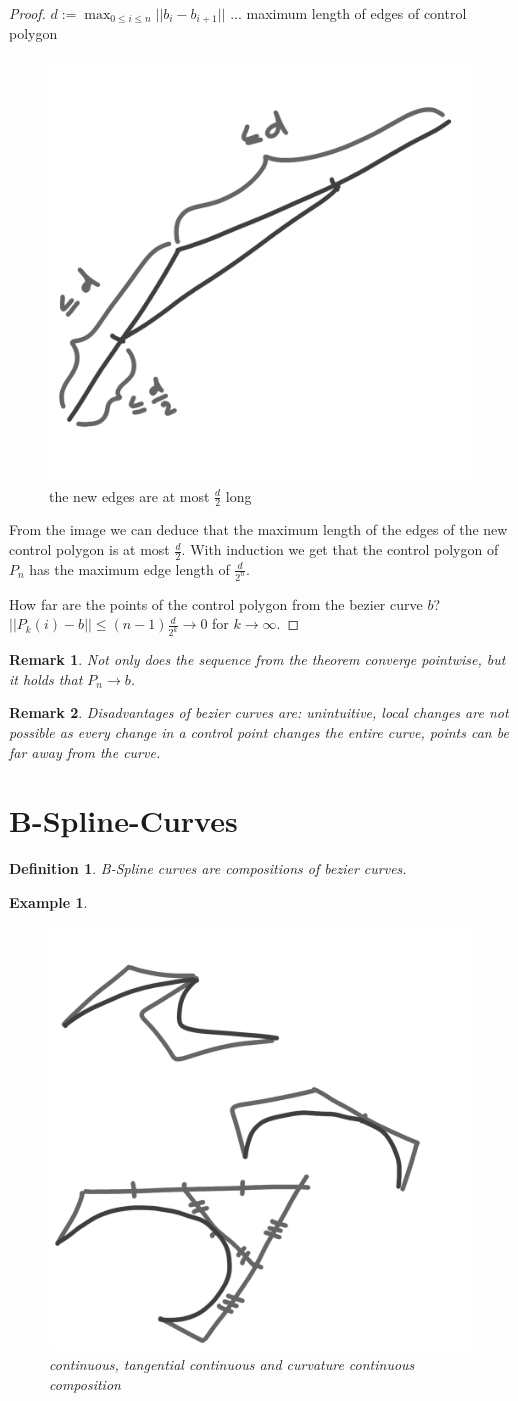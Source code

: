 \documentclass[]{article}
\newtheorem{definition}{Definition}
\newtheorem{example}{Example}
\newtheorem{remark}{Remark}
\begin{document}
\begin{proof}
	$d := \max_{0 \leq i \leq n} ||b_i - b_{i+1}||$ ... maximum length of edges of control polygon
	
	\begin{figure}[h!]
		\centering
		\includegraphics[width=0.3\linewidth]{figures/corner_cutting}
		\caption{the new edges are at most $\frac{d}{2}$ long}
		\label{fig:corner_cutting}
	\end{figure}
	
	From the image we can deduce that the maximum length of the edges of the new control polygon is at most $\frac{d}{2}$. With induction we get that the control polygon of $P_n$ has the maximum edge length of $\frac{d}{2^n}$.
	
	How far are the points of the control polygon from the bezier curve $b$? $||P_k(i) - b|| \leq (n-1) \frac{d}{2^k} \rightarrow 0$ for $k \rightarrow \infty$.
\end{proof}

\begin{remark}
	Not only does the sequence from the theorem converge pointwise, but it holds that $P_n \rightarrow b$.
\end{remark}

\begin{remark}
	Disadvantages of bezier curves are: unintuitive, local changes are not possible as every change in a control point changes the entire curve, points can be far away from the curve.
\end{remark}

\section{B-Spline-Curves}

\begin{definition}
	B-Spline curves are compositions of bezier curves.
\end{definition}

\begin{example}
	\begin{figure}[h!]
		\centering
		\includegraphics[width=0.3\linewidth]{figures/continous_b_spline}
		\caption{continuous, tangential continuous and curvature continuous composition}
		\label{fig:continous_b_spline}
	\end{figure}
\end{example}
\end{document}
